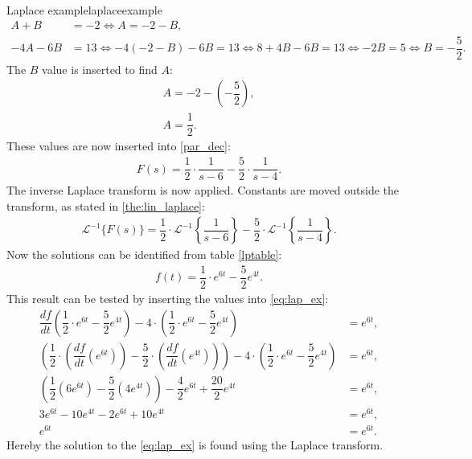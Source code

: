 \begin{example}{Laplace example}{laplaceexample}
\begin{align*}
A+B &=-2 \Leftrightarrow A=-2-B, \\
-4A-6B &=13 \Leftrightarrow -4(-2-B)-6B = 13 \Leftrightarrow 8 + 4B - 6B = 13 \Leftrightarrow -2B = 5 \Leftrightarrow B = -\dfrac{5}{2}.
\end{align*}
The $B$ value is inserted to find $A$:
\begin{align*}
A=-2- \left(-\dfrac{5}{2} \right), \\
A=\dfrac{1}{2}.
\end{align*}
These values are now inserted into \eqref{par_dec}:
\begin{align*}
F(s) = \dfrac{1}{2} \cdot \dfrac{1}{s-6} - \dfrac{5}{2} \cdot \dfrac{1}{s-4}.
\end{align*}
The inverse Laplace transform is now applied. Constants are moved outside the transform, as stated in \cref{the:lin_laplace}:
\begin{align*}
\mathcal{L}^{-1} \big\{F(s) \big\} = \dfrac{1}{2} \cdot \mathcal{L}^{-1} \left\{\dfrac{1}{s-6} \right\} - \dfrac{5}{2} \cdot \mathcal{L}^{-1} \left\{\dfrac{1}{s-4} \right\}.
\end{align*}
Now the solutions can be identified from table \ref{lptable}:
\begin{align*}
f(t) = \dfrac{1}{2} \cdot e^{6t} - \dfrac{5}{2}e^{4t}.
\end{align*}
This result can be tested by inserting the values into \eqref{eq:lap_ex}:
\begin{align*}
\dfrac{df}{dt} \left(\dfrac{1}{2} \cdot e^{6t} - \dfrac{5}{2}e^{4t} \right) - 4 \cdot \left(\dfrac{1}{2} \cdot e^{6t} - \dfrac{5}{2}e^{4t} \right) &= e^{6t}, \\
\left(\dfrac{1}{2} \cdot \left(\dfrac{df}{dt} \left(e^{6t} \right) \right) - \dfrac{5}{2} \cdot \left(\dfrac{df}{dt} \left(e^{4t} \right) \right) \right) - 4 \cdot \left(\dfrac{1}{2} \cdot e^{6t} - \dfrac{5}{2} e^{4t} \right) &= e^{6t}, \\
\left(\dfrac{1}{2} \left(6e^{6t} \right) - \dfrac{5}{2} \left(4e^{4t} \right) \right) - \dfrac{4}{2}e^{6t}+\dfrac{20}{2}e^{4t}&= e^{6t},\\
3e^{6t}-10e^{4t}-2e^{6t}+10e^{4t} &= e^{6t}, \\
e^{6t} &= e^{6t}.
\end{align*}
Hereby the solution to the \eqref{eq:lap_ex} is found using the Laplace transform.
\end{example}